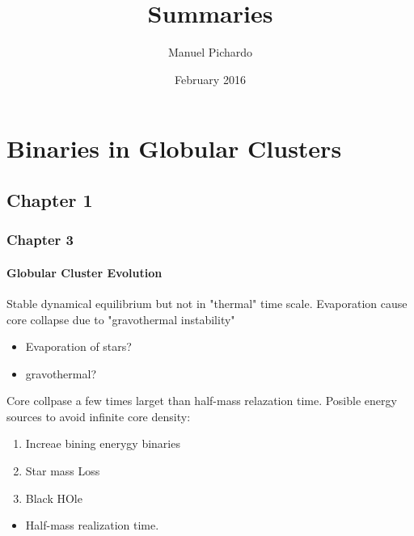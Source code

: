 \documentclass{article}
\title{Summaries}
\author{Manuel Pichardo}
\date{February 2016}
\newcounter{para}[subsubsection]
\begin{document}
\maketitle

\chapter{Binaries in Globular Clusters}

\section{Chapter 1}



\subsection{Chapter 3}

\subsubsection{Globular Cluster Evolution}

\vspace{.3cm}
\addtocounter{para}{1}
\vspace{.3cm}

Stable dynamical equilibrium but not in "thermal" time scale. Evaporation cause core collapse due to "gravothermal instability"



\begin{itemize}
    \item Evaporation of stars?
    \item gravothermal?
\end{itemize}


\vspace{.3cm}
\addtocounter{para}{1}
\vspace{.3cm}

Core collpase a few times larget than half-mass relazation time. Posible energy sources to avoid infinite core density:

\begin{enumerate}
    \item Increae bining enerygy binaries
    \item Star mass Loss
    \item Black HOle
\end{enumerate}
\begin{itemize}
    \item Half-mass realization time.
\end{itemize}
\end{document}
